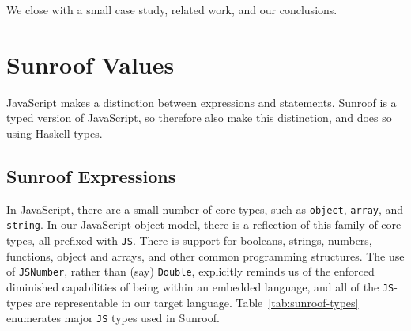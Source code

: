 \documentclass{llncs}
\newcommand{\Src}[1]{{\tt{#1}}}
\begin{document}
We close with a small case study, related work, and our conclusions.



\section{Sunroof Values} %
\label{sec:object-model}

JavaScript makes a distinction between expressions and statements.
Sunroof is a typed version of JavaScript, so therefore also
make this distinction, and does so using Haskell types.

\subsection{Sunroof Expressions}

In JavaScript, there are a small number of core types, such as \Src{object}, \Src{array}, and \Src{string}.
In our JavaScript object model, there is a reflection of this family of core types, all prefixed with \Src{JS}.
There is support for booleans, strings, numbers, functions,
object and arrays, and other common programming structures.
The use of \Src{JSNumber}, rather than (say) \Src{Double},
explicitly reminds us of the enforced diminished capabilities of
being within an embedded language,
and all of the \Src{JS}-types are representable in our target language.
Table~\ref{tab:sunroof-types} enumerates major \Src{JS} types used in Sunroof.
\end{document}
